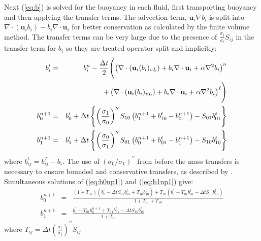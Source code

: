 \documentclass[draft]{agujournal2019}
\begin{document}
Next  (\ref{eq:b}) is solved for the buoyancy in each fluid, first
transporting buoyancy and then applying the transfer terms.
The advection term, $\mathbf{u}_i\nabla b_i$ is split into $\nabla\cdot(\mathbf{u}_i b_i) - b_i \nabla\cdot\mathbf{u}_i$ for better conservation as calculated by the finite volume method.
The transfer
terms can be very large due to the presence of $\frac{\sigma_{j}}{\sigma_{i}}S_{ij}$
in the transfer term for $b_{i}$ so they are treated operator split
and implicitly:
\begin{eqnarray}
b_{i}^{\prime} & = & b_{i}^{n}-\frac{\Delta t}{2}\Biggl(\left(\nabla\cdot\left(\mathbf{u}_{i}(b_{i})_{vL}\right)+b_{i}\nabla\cdot\mathbf{u}_{i}+\alpha\nabla^{2}b_{i}\right)^{n}\label{eq:transportb}\\
 &  & \hfill+\left(\nabla\cdot\left(\mathbf{u}_{i}(b_{i})_{vL}\right)+b_{i}\nabla\cdot\mathbf{u}_{i}+\alpha\nabla^{2}b_{i}\right)^{\ell}\Biggr)\\
b_{0}^{n+1} & = & b_{0}^{\prime}+\Delta t\left\{ \left(\frac{\sigma_{1}}{\sigma_{0}}\right)^{\prime\prime}S_{10}\left(b_{1}^{n+1}+b_{10}^{t}-b_{0}^{n+1}\right)-S_{01}b_{01}^{t}\right\} \label{eq:b0np1}\\
b_{1}^{n+1} & = & b_{1}^{\prime}+\Delta t\left\{ \left(\frac{\sigma_{0}}{\sigma_{1}}\right)^{\prime\prime}S_{01}\left(b_{0}^{n+1}+b_{01}^{t}-b_{1}^{n+1}\right)-S_{10}b_{10}^{t}\right\} \label{eq:b1np1}
\end{eqnarray}
where $b_{ij}^{t}=b_{ij}^{T}-b_{i}$. The use of $(\sigma_{0}/\sigma_{1})^{\prime\prime}$
from before the mass transfers is necessary to ensure bounded and
conservative transfers, as described by \cite{MWH20}. Simultaneous
solutions of (\ref{eq:b0np1}) and (\ref{eq:b1np1}) give:
\begin{eqnarray}
b_{0}^{n+1} & = & \frac{\left(1+T_{01}\right)\left(b_{0}^{\prime}-\Delta tS_{01}b_{01}^{t}+T_{10}b_{10}^{t}\right)+T_{10}\left(b_{1}^{\prime}+T_{01}b_{01}^{t}-\Delta tS_{10}b_{10}^{t}\right)}{1+T_{01}+T_{10}}\\
b_{1}^{n+1} & = & \frac{b_{1}^{\prime}+T_{01}b_{0}^{n+1}+T_{01}b_{01}^{t}-\Delta tS_{10}b_{10}^{t}}{1+T_{01}}
\end{eqnarray}
where $T_{ij}=\Delta t\left(\frac{\sigma_{i}}{\sigma_{j}}\right)^{\prime\prime}S_{ij}$
\end{document}

